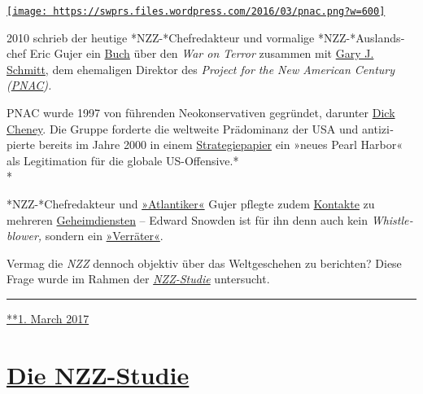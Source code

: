 \href{https://swprs.org/2017/03/01/nzz-new-american-century/}{\texttt{[image: https://swprs.files.wordpress.com/2016/03/pnac.png?w=600]}}

2010 schrieb der heutige *NZZ-*Chef­re­dakteur und vor­ma­lige
*NZZ-*Aus­lands­chef Eric Gujer ein
\href{https://www.amazon.com/Safety-Liberty-Islamist-Terrorism-Counterterrorism/dp/084474333X}{Buch}
über den \emph{War on Terror} zu­sammen mit
\href{https://en.wikipedia.org/wiki/Gary_Schmitt}{Gary J. Schmitt}, dem
ehe­ma­li­gen Dir­ektor des \emph{Project for the New American Century
(\href{https://en.wikipedia.org/wiki/Project_for_the_New_American_Century}{PNAC}).}

PNAC wurde 1997 von füh­ren­den Neo­kon­ser­va­ti­ven ge­gründet,
darunter \href{https://de.wikipedia.org/wiki/Dick_Cheney}{Dick Cheney}.
Die Gruppe for­derte die weltweite Prädominanz der USA und
anti­zi­pierte be­reits im Jahre 2000 in ei­nem
\href{https://web.archive.org/web/20130817122719/http://www.newamericancentury.org/RebuildingAmericasDefenses.pdf}{Stra­tegie­­papier}
ein »neues Pearl Harbor« als Legi­ti­ma­tion für die globale
US-Offensive.*\\
*

*NZZ-*Chef­redakteur und
\href{http://bazonline.ch/schweiz/Ein-Atlantiker-an-der-Spitze/story/18216373}{»Atlan­ti­ker«}
Gujer pf‌legte zudem \href{https://www.taz.de/!430263/}{Kon­takte} zu
mehreren
\href{https://web.archive.org/web/20150515195718/http://www.schweizamsonntag.ch/ressort/medien/nzz-chefredaktor_gujer_und_der_geheimdienst/}{Ge­heim­dien­s­ten}
-- Edward Snow­den ist für ihn denn auch kein \emph{Whistle­blower,}
sondern ein
\href{http://www.nzz.ch/schweiz/bern-ist-nicht-bagdad-1.18122326}{»Ver­rä­ter«}.

Vermag die \emph{NZZ} den­noch ob­jek­tiv über das Welt­ge­sche­hen zu
berichten? Diese Frage wur­de im Rah­men der
\emph{\href{https://swprs.org/die-nzz-studie/}{NZZ-Studie}} untersucht.

\begin{center}\rule{0.5\linewidth}{\linethickness}\end{center}

\href{https://swprs.org/2017/03/01/nzz-new-american-century/}{**1. March
2017}

\hypertarget{die-nzz-studie}{%
\section{\texorpdfstring{\href{https://swprs.org/2017/03/01/die-nzz-studie/}{Die
NZZ-Studie}}{Die NZZ-Studie}}\label{die-nzz-studie}}

